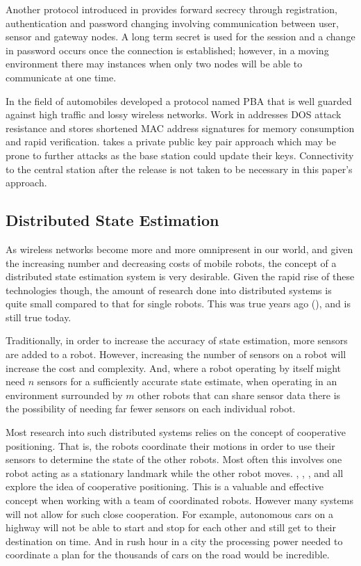 \documentclass[conference]{IEEEtran}
\begin{document}
Another protocol introduced in \cite{chang2016provably} provides forward secrecy through registration, authentication and password changing involving communication between user, sensor and gateway nodes. A long term secret is used for the session and a change in password occurs once the connection is established; however, in a moving environment there may instances when only two nodes will be able to communicate at one time.

In the field of automobiles \cite{lyu2016pba} developed a protocol named PBA that is well guarded against high traffic and lossy wireless networks. Work in \cite{lyu2016pba} addresses DOS attack resistance and stores shortened MAC address signatures for memory consumption and rapid verification. \cite{lyu2016pba} takes a private public key pair approach which may be prone to further attacks as the base station could update their keys. Connectivity to the central station after the release is not taken to be necessary in this paper's approach.

\subsection{Distributed State Estimation}
As wireless networks become more and more omnipresent in our world, and given the increasing number and decreasing costs of mobile robots, the concept of a distributed state estimation system is very desirable. Given the rapid rise of these technologies though, the amount of research done into distributed systems is quite small compared to that for single robots. This was true years ago (\cite{Parker2000}), and is still true today.

Traditionally, in order to increase the accuracy of state estimation, more sensors are added to a robot. However, increasing the number of sensors on a robot will increase the cost and complexity. And, where a robot operating by itself might need $n$ sensors for a sufficiently accurate state estimate, when operating in an environment surrounded by $m$ other robots that can share sensor data there is the possibility of needing far fewer sensors on each individual robot.

Most research into such distributed systems relies on the concept of cooperative positioning. That is, the robots coordinate their motions in order to use their sensors to determine the state of the other robots. Most often this involves one robot acting as a stationary landmark while the other robot moves. \cite{Kurazume1994}, \cite{Kurazume1996}, \cite{Kurazume1998}, and \cite{Kurazume2000} all explore the idea of cooperative positioning. This is a valuable and effective concept when working with a team of coordinated robots. However many systems will not allow for such close cooperation. For example, autonomous cars on a highway will not be able to start and stop for each other and still get to their destination on time. And in rush hour in a city the processing power needed to coordinate a plan for the thousands of cars on the road would be incredible.
\end{document}
